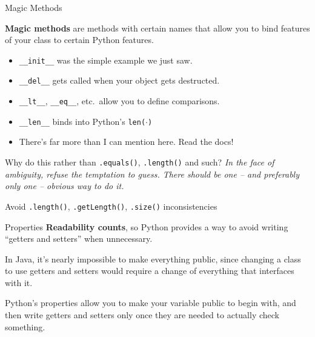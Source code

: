 \documentclass{lug}
\begin{document}
\begin{frame}{Magic Methods}

    \textbf{Magic methods} are methods with certain names that allow you to
    bind features of your class to certain Python features.

    \begin{itemize}[<+->]
        \item \texttt{\_\_init\_\_} was the simple example we just saw.
        \item \texttt{\_\_del\_\_} gets called when your object gets
            destructed.
        \item \texttt{\_\_lt\_\_}, \texttt{\_\_eq\_\_}, etc.\ allow you to
            define comparisons.
        \item \texttt{\_\_len\_\_} binds into Python's \texttt{len($\cdot$)}
        \item There's far more than I can mention here. Read the docs!
    \end{itemize}

    \pause[\thebeamerpauses]

    \begin{block}{Why do this rather than \texttt{.equals()},
        \texttt{.length()} and such?}
        \small
        \emph{%
        In the face of ambiguity, refuse the temptation to guess.
        There should be one -- and preferably only one -- obvious way to do it.
        }

        Avoid \texttt{.length()}, \texttt{.getLength()}, \texttt{.size()}
        inconsistencies
    \end{block}

\end{frame}

\begin{frame}{Properties}
    \textbf{Readability counts}, so Python provides a way to avoid writing
    ``getters and setters'' when unnecessary.

    \pause

    In Java, it's nearly impossible to make everything public, since changing
    a class to use getters and setters would require a change of everything
    that interfaces with it.

    \pause

    Python's properties allow you to make your variable public to begin with,
    and then write getters and setters only once they are needed to actually
    check something.

\end{frame}
\end{document}
